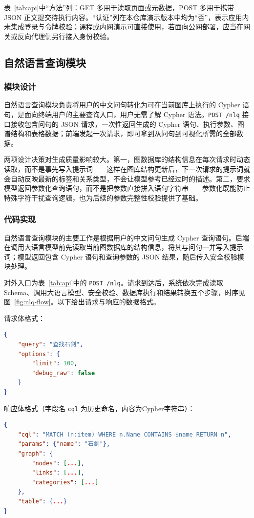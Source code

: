 \documentclass[12pt,a4paper]{article}
\begin{document}
表~\ref{tab:api}中``方法''列：GET 多用于读取页面或元数据，POST 多用于携带 JSON 正文提交待执行内容。``认证''列在本仓库演示版本中均为``否''，表示应用内未集成登录与令牌校验；课程或内网演示可直接使用，若面向公网部署，应当在网关或反向代理侧另行接入身份校验。

\subsection{自然语言查询模块}
\label{subsec:nlq-impl}

\subsubsection{模块设计}

自然语言查询模块负责将用户的中文问句转化为可在当前图库上执行的 Cypher 语句，是面向终端用户的主要查询入口，用户无需了解 Cypher 语法。\texttt{POST /nlq} 接口接收包含问句的 JSON 请求，一次性返回生成的 Cypher 语句、执行参数、图谱结构和表格数据；前端发起一次请求，即可拿到从问句到可视化所需的全部数据。

两项设计决策对生成质量影响较大。第一，图数据库的结构信息在每次请求时动态读取，而不是事先写入提示词——这样在图库结构更新后，下一次请求的提示词就会自动反映最新的标签和关系类型，不会让模型参考已经过时的描述。第二，要求模型返回参数化查询语句，而不是把参数直接拼入语句字符串——参数化既能防止特殊字符干扰查询逻辑，也为后续的参数完整性校验提供了基础。

\subsubsection{代码实现}

自然语言查询模块的主要工作是根据用户的中文问句生成 Cypher 查询语句。后端在调用大语言模型前先读取当前图数据库的结构信息，将其与问句一并写入提示词；模型返回包含 Cypher 语句和查询参数的 JSON 结果，随后传入安全校验模块处理。

对外入口为表~\ref{tab:api}中的 \texttt{POST /nlq}。请求到达后，系统依次完成读取 Schema、调用大语言模型、安全校验、数据库执行和结果转换五个步骤，时序见图~\ref{fig:nlq-flow}。以下给出请求与响应的数据格式。

请求体格式：
\begin{lstlisting}[language=json, caption={自然语言查询请求体}]
{
    "query": "查找石剑",
    "options": {
        "limit": 100,
        "debug_raw": false
    }
}
\end{lstlisting}

响应体格式（字段名 \texttt{cql} 为历史命名，内容为Cypher字符串）：
\begin{lstlisting}[language=json, caption={自然语言查询响应体}]
{
    "cql": "MATCH (n:item) WHERE n.Name CONTAINS $name RETURN n",
    "params": {"name": "石剑"},
    "graph": {
        "nodes": [...],
        "links": [...],
        "categories": [...]
    },
    "table": {...}
}
\end{lstlisting}
\end{document}
